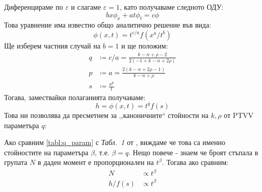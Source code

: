 Диференцираме по $\varepsilon$ и слагаме $\varepsilon = 1$, като получаваме следното ОДУ:
\begin{equation*}
    b x{\phi _x} + a t{\phi _t} = c \phi
\end{equation*}
Това уравнение има известно общо аналитично решение във вида:
\begin{equation*}
    \phi(x, t) = t^{c/a} f \left(x^a / t^b \right)
\end{equation*}
Ще изберем частния случай на $b = 1$ и ще положим:
\begin{align*}
    q & \coloneqq c/a = \frac{{k - n + \rho  - 2}}{{2\left( { - 1 + k - n + 2\rho } \right)}} \\
    p & \coloneqq a= \frac{{2\left( {k - n + 2\rho  - 1} \right)}}{{k - n + \rho }} \\
    s & \coloneqq \frac{x^p}{t}
\end{align*}
Тогава, замествайки полаганията получаваме:
\begin{equation*}
    h = \phi(x, t) = t^q f(s)
\end{equation*}
Това ни позволява да пресметнем за ,,каноничните`` стойности на $k, \rho$ от PTVV \cite{Kozlov2022} параметъра $q$:
\begin{table}[hbpt]
\centering
\caption{Стойности на $q$ за различни стойности на $k, \rho$}
\label{tabl:q_param}
\end{table}
Ако сравним \autoref{tabl:q_param} с \textit{Табл.~1} от \cite{Kozlov2022}, виждаме че това са именно стойностите на параметъра $\beta$, т.е. $\beta = q$. Нещо повече - знаем че броят стъпала в групата $N$ в даден момент е пропорционален на $t^\beta$. Тогава ако сравним:
\begin{align*}
    N      & \propto t^\beta \\
    h/f(s) & \propto t^\beta 
\end{align*}
